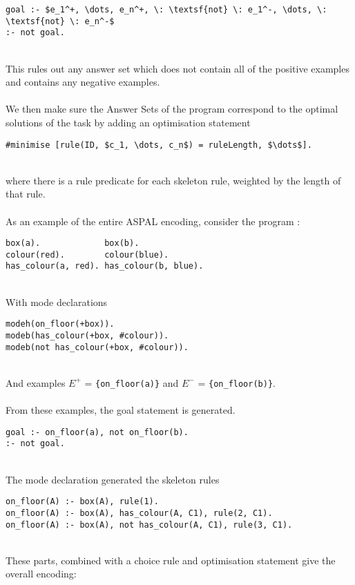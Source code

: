 \begin{lstlisting}[mathescape=true]
goal :- $e_1^+, \dots, e_n^+, \: \textsf{not} \: e_1^-, \dots, \: \textsf{not} \: e_n^-$
:- not goal.
\end{lstlisting}
\mbox{}\\
This rules out any answer set which does not contain all of the positive examples and contains any negative examples. \\ \\
We then make sure the Answer Sets of the program correspond to the optimal solutions of the task by adding an optimisation statement \\

\begin{lstlisting}[mathescape=true]
#minimise [rule(ID, $c_1, \dots, c_n$) = ruleLength, $\dots$].
\end{lstlisting}
\mbox{}\\
where there is a rule predicate for each skeleton rule, weighted by the length of that rule.\\ \\
As an example of the entire ASPAL encoding, consider the program :

\begin{lstlisting}
box(a).				box(b).
colour(red).		colour(blue).
has_colour(a, red).	has_colour(b, blue).
\end{lstlisting}
\mbox{}\\
With mode declarations \\ 

\begin{lstlisting}
modeh(on_floor(+box)).
modeb(has_colour(+box, #colour)).
modeb(not has_colour(+box, #colour)).
\end{lstlisting}
\mbox{}\\
And examples $E^+$ = \lstinline!{on_floor(a)}! and $E^-$ = \lstinline!{on_floor(b)}!. \\ \\
From these examples, the goal statement is generated. \\

\begin{lstlisting}
goal :- on_floor(a), not on_floor(b).
:- not goal.
\end{lstlisting}
\mbox{}\\
The mode declaration generated the skeleton rules \\

\begin{lstlisting}
on_floor(A) :- box(A), rule(1).
on_floor(A) :- box(A), has_colour(A, C1), rule(2, C1).
on_floor(A) :- box(A), not has_colour(A, C1), rule(3, C1).
\end{lstlisting}
\mbox{}\\
These parts, combined with a choice rule and optimisation statement give the overall encoding:\\

